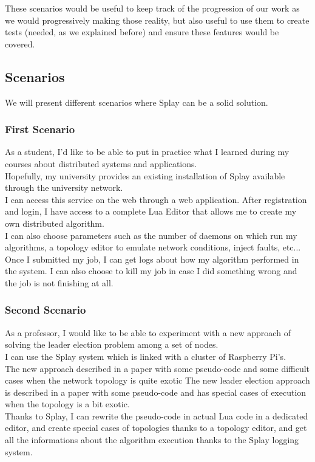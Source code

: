 \documentclass{eplmastersthesis}
\begin{document}
    These scenarios would be useful to keep track of the progression of our
    work as we would progressively making those reality, but also useful
    to use them to create tests (needed, as we explained before) and ensure
    these features would be covered.
    \subsection{Scenarios} %
      We will present different scenarios where Splay can be a solid solution.

      \subsubsection{First Scenario}

        As a student, I'd like to be able to put in practice what I learned
        during my courses about distributed systems and applications.\\
        Hopefully, my university provides an existing installation of Splay
        available through the university network.\\
        I can access this service on the web through a web application. After
        registration and login, I have access to a complete Lua Editor that
        allows me to create my own distributed algorithm.\\
        I can also choose parameters such as the number of daemons on
        which run my algorithms, a topology editor to emulate network
        conditions, inject faults, etc...\\
        Once I submitted my job, I can get logs about how my algorithm
        performed in the system. I can also choose to kill my job in case
        I did something wrong and the job is not finishing at all.

      \subsubsection{Second Scenario}

        As a professor, I would like to be able to experiment with a new
        approach of solving the leader election problem among a set of
        nodes.\\
        I can use the Splay system which is linked with a cluster of
        Raspberry Pi's.\\
        The new approach described in a paper with some pseudo-code and some difficult
        cases when the network topology is quite exotic
        The new leader election approach is described in a paper with some
        pseudo-code and has special cases of execution when the topology is
        a bit exotic.\\
        Thanks to Splay, I can rewrite the pseudo-code in actual Lua code
        in a dedicated editor, and create special cases of topologies
        thanks to a topology editor, and get all the informations about
        the algorithm execution thanks to the Splay logging system.
\end{document}
